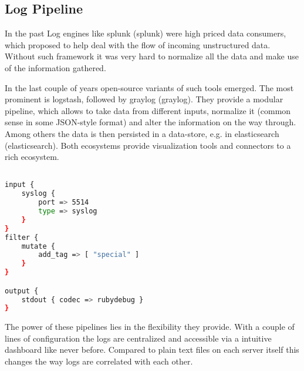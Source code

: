 \subsection{Log Pipeline}
In the past Log engines like \gls{splunk} (\glsdesc{splunk}) were high priced data consumers, which proposed to help deal with the
flow of incoming unstructured data. Without such framework it was very hard to normalize all the data and make use of the information gathered.

In the last couple of years open-source variants of such tools emerged. The most prominent is \gls{logstash}, followed by \gls{graylog} (\glsdesc{graylog}).
They provide a modular pipeline, which allows to take data from different inputs, normalize it (common sense in some JSON-style format)
and alter the information on the way through. Among others the data is then persisted in a data-store, e.g. in \gls{elasticsearch} (\glsdesc{elasticsearch}).
Both ecosystems provide visualization tools and connectors to a rich ecosystem.

\begin{lstlisting}[language=bash,label={lst:ls_cfg},
    caption={Basic Logstash configuration}]

input {
    syslog {
        port => 5514
        type => syslog
    }
}
filter {
    mutate {
        add_tag => [ "special" ]
    }
}

output {
    stdout { codec => rubydebug }
}
\end{lstlisting}

The power of these pipelines lies in the flexibility they provide. With a couple of lines of configuration the logs are centralized and accessible
via a intuitive dashboard like never before. Compared to plain text files on each server itself this changes the way logs are correlated with each other.

